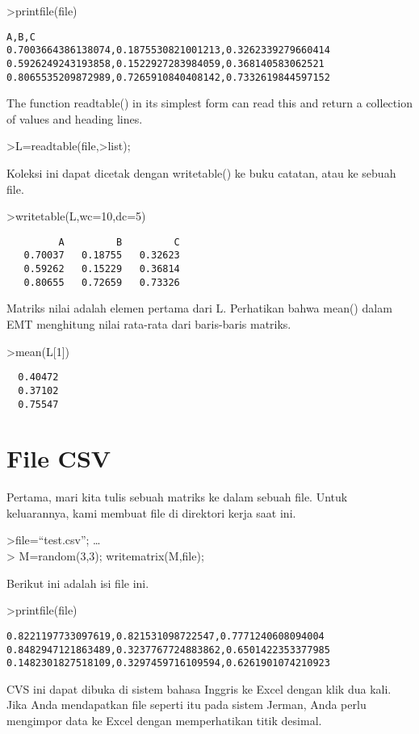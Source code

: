 \documentclass[
]{book}
\begin{document}
\textgreater printfile(file)

\begin{verbatim}
A,B,C
0.7003664386138074,0.1875530821001213,0.3262339279660414
0.5926249243193858,0.1522927283984059,0.368140583062521
0.8065535209872989,0.7265910840408142,0.7332619844597152
\end{verbatim}

The function readtable() in its simplest form can read this and return a collection of values and heading lines.

\textgreater L=readtable(file,\textgreater list);

Koleksi ini dapat dicetak dengan writetable() ke buku catatan, atau ke sebuah file.

\textgreater writetable(L,wc=10,dc=5)

\begin{verbatim}
         A         B         C
   0.70037   0.18755   0.32623
   0.59262   0.15229   0.36814
   0.80655   0.72659   0.73326
\end{verbatim}

Matriks nilai adalah elemen pertama dari L. Perhatikan bahwa mean() dalam EMT menghitung nilai rata-rata dari baris-baris matriks.

\textgreater mean(L{[}1{]})

\begin{verbatim}
  0.40472 
  0.37102 
  0.75547 
\end{verbatim}

\chapter{File CSV}\label{file-csv}

Pertama, mari kita tulis sebuah matriks ke dalam sebuah file. Untuk keluarannya, kami membuat file di direktori kerja saat ini.

\textgreater file=``test.csv''; \ldots{}\\
\textgreater{} M=random(3,3); writematrix(M,file);

Berikut ini adalah isi file ini.

\textgreater printfile(file)

\begin{verbatim}
0.8221197733097619,0.821531098722547,0.7771240608094004
0.8482947121863489,0.3237767724883862,0.6501422353377985
0.1482301827518109,0.3297459716109594,0.6261901074210923
\end{verbatim}

CVS ini dapat dibuka di sistem bahasa Inggris ke Excel dengan klik dua kali. Jika Anda mendapatkan file seperti itu pada sistem Jerman, Anda perlu mengimpor data ke Excel dengan memperhatikan titik desimal.
\end{document}
